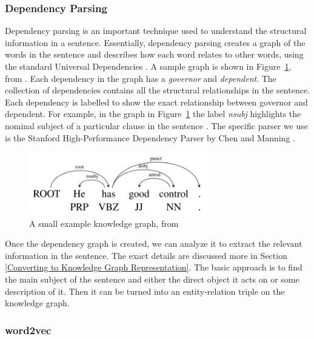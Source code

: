 \documentclass[pageno]{jpaper}
\begin{document}
\subsubsection{Dependency Parsing}
\label{Dependency Parsing}

Dependency parsing is an important technique used to understand the structural
information in a sentence. Essentially, dependency parsing creates a graph of
the words in the sentence and describes how each word relates to other words,
using the standard Universal Dependencies \cite{De2014}. A sample graph is shown
in Figure~\ref{fig: dependency parsing}, from \cite{Chen2014}. Each dependency
in the graph has a \textit{governor} and \textit{dependent}. The collection of
dependencies contains all the structural relationships in the sentence. Each
dependency is labelled to show the exact relationship between governor and
dependent. For example, in the graph in Figure~\ref{fig: dependency parsing} the
label \textit{nsubj} highlights the nominal subject of a particular clause in
the sentence \cite{De2014}. The specific parser we use is the Stanford
High-Performance Dependency Parser by Chen and Manning \cite{Chen2014}.

\begin{figure}[!tb]
    \centering
    \includegraphics[width=0.7\textwidth,keepaspectratio]{figures/Dependency_Graph.png}
    \caption{A small example knowledge graph, from \cite{Chen2014}}
    \label{fig: dependency parsing}
\end{figure}

Once the dependency graph is created, we can analyze it to extract the relevant
information in the sentence. The exact details are discussed more in Section
\ref{Converting to Knowledge Graph Representation}. The basic approach is to
find the main subject of the sentence and either the direct object it acts on or
some description of it. Then it can be turned into an entity-relation triple on
the knowledge graph.

\subsubsection{word2vec}
\label{word2vec}
\end{document}
